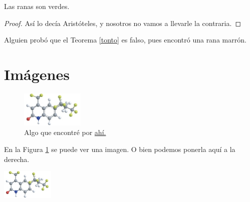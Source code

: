 \documentclass[11pt]{amsart}
\begin{document}
\begin{teorema}\label{tonto}
Las ranas son verdes.
\end{teorema}
\begin{proof}
Así lo decía Aristóteles, y nosotros no vamos a llevarle la contraria.
\end{proof}

\begin{nota}
Alguien probó que el Teorema \ref{tonto} es falso, pues encontró una rana marrón.
\end{nota}


\section{Imágenes}

\begin{figure}
\includegraphics[width=3cm]{imagen.jpg}  %
\caption{Algo que encontré por %
\href{http://www3.interscience.wiley.com/journal/13087/home/ForAuthors.html}{ahí.}%
}
\label{uno} 
\end{figure}

\begin{minipage}{8cm}
En la Figura \ref{uno} se puede ver una imagen. O bien podemos ponerla aquí a la derecha. 
\end{minipage} 
\hfill \begin{minipage}{3cm}
\includegraphics[width=2.5cm]{imagen.jpg}
\end{minipage}
\end{document}

